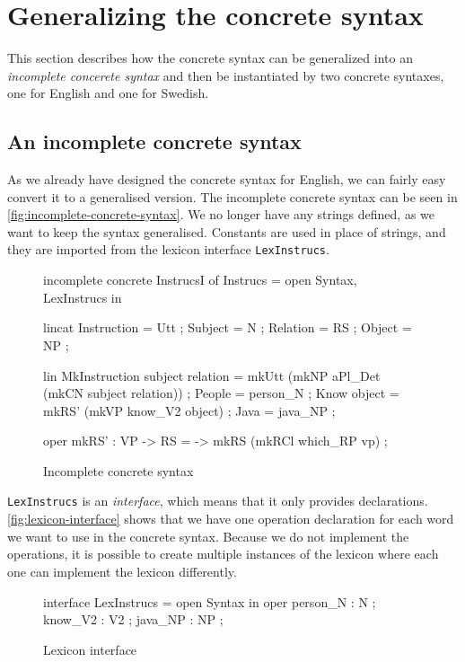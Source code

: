 \section{Generalizing the concrete syntax}

This section describes how the concrete syntax can be generalized into an \emph{incomplete concerete syntax} and then be instantiated by two concrete syntaxes, one for English and one for Swedish.

\subsection*{An incomplete concrete syntax}

As we already have designed the concrete syntax for English, we can fairly easy convert it to a generalised version. The incomplete concrete syntax can be seen in \autoref{fig:incomplete-concrete-syntax}. We no longer have any strings defined, as we want to keep the syntax generalised. Constants are used in place of strings, and they are imported from the lexicon interface  \texttt{LexInstrucs}.

\begin{figure}[H]
\begin{code}
incomplete concrete InstrucsI of Instrucs = open Syntax, LexInstrucs in {
  lincat
    Instruction = Utt ;
    Subject = N ;
    Relation = RS ;
    Object = NP ;

  lin
    MkInstruction subject relation = mkUtt 
                                      (mkNP aPl_Det (mkCN subject relation)) ;
    People = person_N ;
    Know object = mkRS' (mkVP know_V2 object) ;
    Java = java_NP ;

   oper
      mkRS' : VP -> RS = \vp -> mkRS (mkRCl which_RP vp) ;
}
\end{code}
\caption{Incomplete concrete syntax\label{fig:incomplete-concrete-syntax}}
\end{figure}

\texttt{LexInstrucs} is an \emph{interface}, which means that it only provides declarations. \autoref{fig:lexicon-interface} shows that we have one operation declaration for each word we want to use in the concrete syntax. Because we do not implement the operations, it is possible to create multiple instances of the lexicon where each one can implement the lexicon differently.

\begin{figure}[H]
\begin{code}
interface LexInstrucs = open Syntax in {
   oper
     person_N : N ;
     know_V2  : V2 ;
     java_NP  : NP ;
}
\end{code}
\caption{Lexicon interface\label{fig:lexicon-interface}}
\end{figure}

